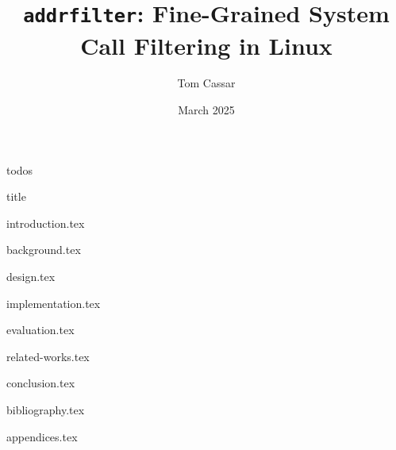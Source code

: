 \documentclass[fontsize=14pt]{article}
\title{\texttt{addrfilter}: Fine-Grained System Call Filtering in Linux}
\author{Tom Cassar}
\date{March 2025}
\begin{document}
\maketitle

\clearpage

{todos}

\clearpage

{title}

\clearpage

{introduction.tex}

\clearpage

{background.tex}

\clearpage

{design.tex}

\clearpage

{implementation.tex}

\clearpage

{evaluation.tex}

\clearpage

{related-works.tex}

\clearpage

{conclusion.tex}

\clearpage

{bibliography.tex}

\clearpage

{appendices.tex}
\end{document}
